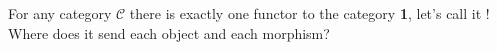For any category $\mathcal{C}$ there is exactly one functor to the category \textbf{1}, let's call it $!$ Where does it send each object and each morphism?